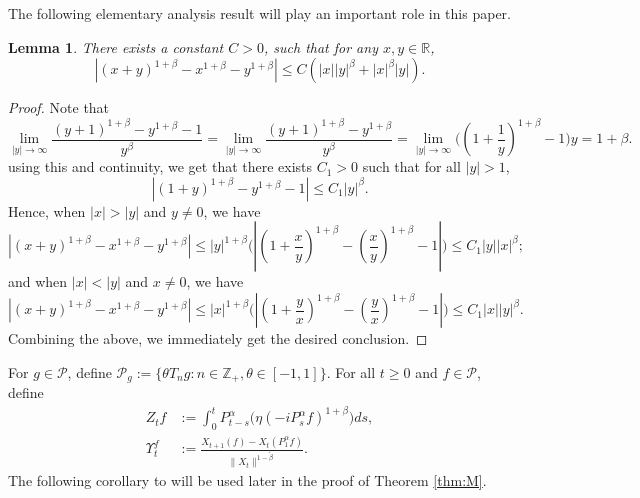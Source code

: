 \documentclass[12pt,a4paper]{amsart}
\theoremstyle{plain}
\newtheorem{lem}[thm]{Lemma}
\theoremstyle{definition}
\numberwithin{equation}{section}
\begin{document}
The following  elementary analysis result will play an important role in this paper.

\begin{lem}\label{ineq: analysis}
There exists a constant $C>0$, such that for any $x,y \in \mathbb R$,
\[
    |(x+y)^{1+\beta}-x^{1+\beta}-y^{1+\beta}|\leq C(|x||y|^{\beta}+|x|^{\beta}|y|).
\]
\end{lem}
\begin{proof}
   Note that
\[
  \lim_{|y|\rightarrow \infty}\frac{(y+1)^{1+\beta}-y^{1+\beta}-1}{y^{\beta}}=\lim_{|y|\rightarrow \infty}\frac{(y+1)^{1+\beta}-y^{1+\beta}}{y^{\beta}}=\lim_{|y|\rightarrow \infty}\big((1+\frac{1}{y})^{1+\beta}-1\big)y = 1+\beta.
\]
using this and continuity, we get that there exists $C_1>0$ such that for all $|y|>1$,
\[
  |(1+y)^{1+\beta}-y^{1+\beta}-1|\leq C_1 |y|^{\beta}.
\]
Hence, when $|x|>|y|$ and $y\neq 0$, we have
\[
|(x+y)^{1+\beta}-x^{1+\beta}-y^{1+\beta}|\leq |y|^{1+\beta}\Big(|(1+\frac{x}{y})^{1+\beta}-(\frac{x}{y})^{1+\beta}-1|\Big)\leq C_1|y||x|^{\beta};
\]
and when $|x|<|y|$ and $x\neq 0$, we have
\[
|(x+y)^{1+\beta}-x^{1+\beta}-y^{1+\beta}|\leq |x|^{1+\beta}\Big(|(1+\frac{y}{x})^{1+\beta}-(\frac{y}{x})^{1+\beta}-1|\Big)\leq C_1|x||y|^{\beta}.
\]
Combining the above, we immediately get the desired conclusion.
\end{proof}

For $g\in \mathcal P$, define $\mathcal P_g:= \{\theta T_ng:n \in \mathbb Z_+, \theta \in [-1,1]\}$. 	For all $t\geq 0$ and $f\in \mathcal P$, define
	\begin{align}
  	Z_t f
  	&:= \int_0^t P^\alpha_{t-s}\big( \eta (-i P^\alpha_sf)^{1+\beta}\big)ds,\\
  	\Upsilon^f_t
   & := \frac{X_{t+1} (f) - X_t(P_1^\alpha f)}{\| X_t\|^{1-\tilde \beta}}.
  	\end{align}
The following corollary to  \cite[Proposition 3.5]{RenSongSunZhao2019Stable} will be used later in the proof of Theorem \ref{thm:M}.
\end{document}
